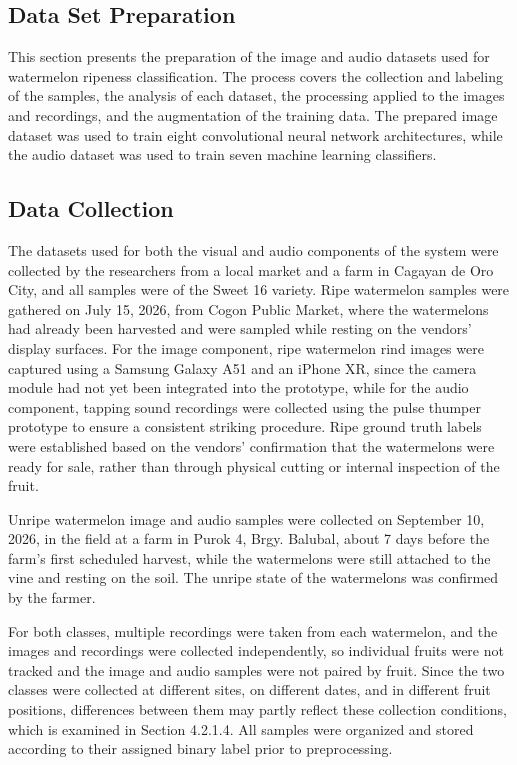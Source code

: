 \begin{thesisprose}
\section{Data Set Preparation}

This section presents the preparation of the image and audio datasets used for watermelon ripeness classification. The process covers the collection and labeling of the samples, the analysis of each dataset, the processing applied to the images and recordings, and the augmentation of the training data. The prepared image dataset was used to train eight convolutional neural network architectures, while the audio dataset was used to train seven machine learning classifiers.

\subsection{Data Collection}

The datasets used for both the visual and audio components of the system were collected by the researchers from a local market and a farm in Cagayan de Oro City, and all samples were of the Sweet 16 variety. Ripe watermelon samples were gathered on July 15, 2026, from Cogon Public Market, where the watermelons had already been harvested and were sampled while resting on the vendors’ display surfaces. For the image component, ripe watermelon rind images were captured using a Samsung Galaxy A51 and an iPhone XR, since the camera module had not yet been integrated into the prototype, while for the audio component, tapping sound recordings were collected using the pulse thumper prototype to ensure a consistent striking procedure. Ripe ground truth labels were established based on the vendors’ confirmation that the watermelons were ready for sale, rather than through physical cutting or internal inspection of the fruit.

Unripe watermelon image and audio samples were collected on September 10, 2026, in the field at a farm in Purok 4, Brgy. Balubal, about 7 days before the farm’s first scheduled harvest, while the watermelons were still attached to the vine and resting on the soil. The unripe state of the watermelons was confirmed by the farmer.

For both classes, multiple recordings were taken from each watermelon, and the images and recordings were collected independently, so individual fruits were not tracked and the image and audio samples were not paired by fruit. Since the two classes were collected at different sites, on different dates, and in different fruit positions, differences between them may partly reflect these collection conditions, which is examined in Section 4.2.1.4. All samples were organized and stored according to their assigned binary label prior to preprocessing.


\end{thesisprose}
